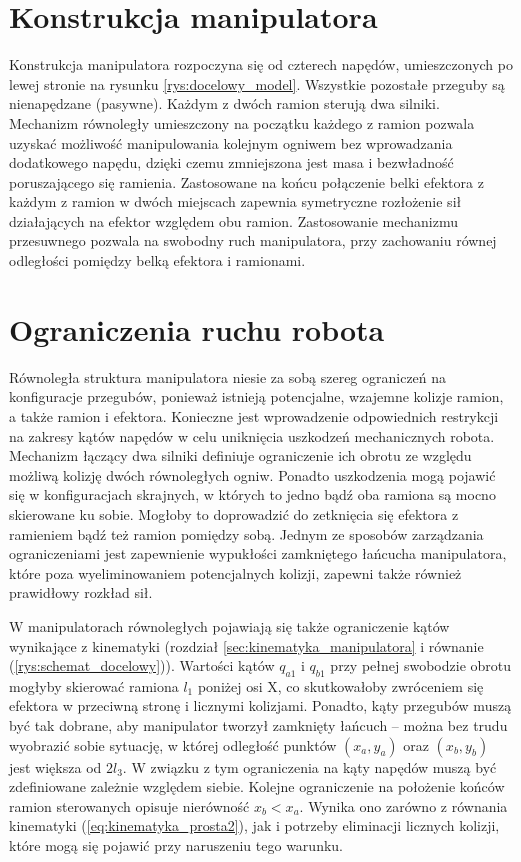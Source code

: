 \documentclass[printmode]{mgr}
\begin{document}
\section{Konstrukcja manipulatora}
Konstrukcja manipulatora rozpoczyna się od czterech napędów, umieszczonych po lewej stronie na rysunku \ref{rys:docelowy_model}.
Wszystkie pozostałe przeguby są nienapędzane (pasywne). Każdym z dwóch ramion sterują dwa silniki. 
Mechanizm równoległy umieszczony na początku każdego z ramion
pozwala uzyskać możliwość manipulowania kolejnym ogniwem bez wprowadzania dodatkowego napędu, dzięki czemu
zmniejszona jest masa i bezwładność poruszającego się ramienia.
Zastosowane na końcu połączenie belki efektora z każdym z ramion w dwóch miejscach zapewnia symetryczne rozłożenie
sił działających na efektor względem obu ramion. Zastosowanie mechanizmu przesuwnego pozwala
na swobodny ruch manipulatora, przy zachowaniu równej odległości pomiędzy belką efektora i ramionami.

\section{Ograniczenia ruchu robota}\label{sec:konfiguracje_niedozwolone}
Równoległa struktura manipulatora niesie za sobą szereg ograniczeń na konfiguracje przegubów, ponieważ
istnieją potencjalne, wzajemne kolizje ramion, a także ramion i efektora. Konieczne jest wprowadzenie odpowiednich restrykcji
na zakresy kątów napędów w celu uniknięcia uszkodzeń mechanicznych robota. Mechanizm
łączący dwa silniki definiuje ograniczenie ich obrotu ze względu możliwą kolizję dwóch równoległych ogniw. 
Ponadto uszkodzenia mogą pojawić się w konfiguracjach skrajnych, w których to jedno bądź oba ramiona są mocno
skierowane ku sobie. Mogłoby to doprowadzić do zetknięcia się efektora z ramieniem bądź też ramion pomiędzy sobą.
Jednym ze sposobów zarządzania ograniczeniami jest zapewnienie wypukłości zamkniętego łańcucha manipulatora, 
które poza wyeliminowaniem potencjalnych kolizji, zapewni także również prawidłowy rozkład sił.

W manipulatorach równoległych pojawiają się także ograniczenie kątów wynikające z kinematyki 
(rozdział \ref{sec:kinematyka_manipulatora} i równanie (\ref{rys:schemat_docelowy})). Wartości kątów $q_{a1}$ i $q_{b1}$ przy pełnej swobodzie obrotu
mogłyby skierować ramiona $l_1$ poniżej osi X, co skutkowałoby zwróceniem się efektora w przeciwną stronę i licznymi kolizjami.
Ponadto, kąty przegubów muszą być tak dobrane, aby manipulator tworzył zamknięty łańcuch -- można bez trudu wyobrazić sobie sytuację,
w której odległość punktów $(x_a, y_a)$ oraz $(x_b, y_b)$ jest większa od $2l_3$. W związku z tym ograniczenia na kąty napędów
muszą być zdefiniowane zależnie względem siebie. Kolejne ograniczenie na położenie końców ramion sterowanych opisuje nierówność $x_b < x_a$.
Wynika ono zarówno z równania kinematyki (\ref{eq:kinematyka_prosta2}), 
jak i potrzeby eliminacji licznych kolizji, które mogą się pojawić przy naruszeniu tego warunku.
\end{document}
